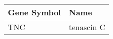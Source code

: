 \begin{tabular}{ll}
\toprule
Gene Symbol &       Name \\
\midrule
        TNC & tenascin C \\
\bottomrule
\end{tabular}
